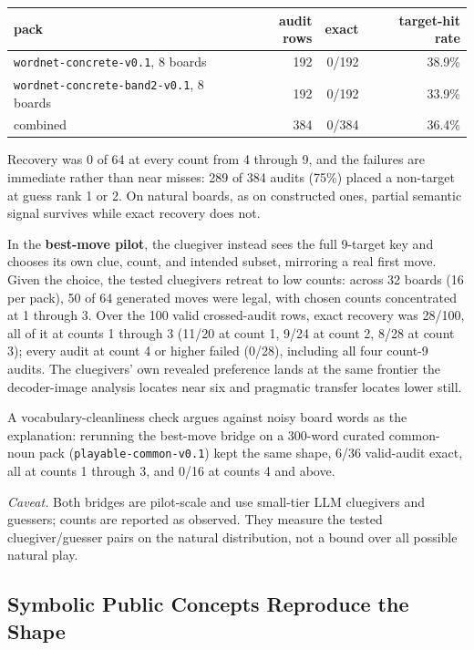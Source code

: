 \documentclass[11pt]{article}
\begin{document}
\begin{center}
\begin{tabular}{lrrr}
\toprule
pack & audit rows & exact & target-hit rate \\
\midrule
\texttt{wordnet-concrete-v0.1}, 8 boards       & 192 & 0/192 & 38.9\% \\
\texttt{wordnet-concrete-band2-v0.1}, 8 boards & 192 & 0/192 & 33.9\% \\
combined                                        & 384 & 0/384 & 36.4\% \\
\bottomrule
\end{tabular}
\end{center}

Recovery was 0 of 64 at every count from 4 through 9, and the failures are
immediate rather than near misses: 289 of 384 audits (75\%) placed a non-target at
guess rank 1 or 2. On natural boards, as on constructed ones, partial semantic
signal survives while exact recovery does not.

In the \textbf{best-move pilot}, the cluegiver instead sees the full 9-target key
and chooses its own clue, count, and intended subset, mirroring a real first move.
Given the choice, the tested cluegivers retreat to low counts: across 32 boards
(16 per pack), 50 of 64 generated moves were legal, with chosen counts
concentrated at 1 through 3. Over the 100 valid crossed-audit rows, exact recovery
was 28/100, all of it at counts 1 through 3 (11/20 at count 1, 9/24 at count 2,
8/28 at count 3); every audit at count 4 or higher failed (0/28), including all
four count-9 audits. The cluegivers' own revealed preference lands at the same
frontier the decoder-image analysis locates near six and pragmatic transfer
locates lower still.

A vocabulary-cleanliness check argues against noisy board words as the
explanation: rerunning the best-move bridge on a 300-word curated common-noun pack
(\texttt{playable-common-v0.1}) kept the same shape, 6/36 valid-audit exact, all
at counts 1 through 3, and 0/16 at counts 4 and above.

\emph{Caveat.} Both bridges are pilot-scale and use small-tier LLM cluegivers and
guessers; counts are reported as observed. They measure the tested
cluegiver/guesser pairs on the natural distribution, not a bound over all possible
natural play.

\subsection{Symbolic Public Concepts Reproduce the Shape}
\end{document}
